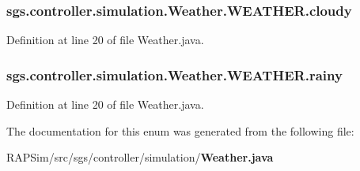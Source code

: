 \subsubsection[{cloudy}]{\setlength{\rightskip}{0pt plus 5cm}sgs.\-controller.\-simulation.\-Weather.\-W\-E\-A\-T\-H\-E\-R.\-cloudy}\label{enumsgs_1_1controller_1_1simulation_1_1_weather_1_1_w_e_a_t_h_e_r_abfd5e1962fe7a1b6d114e8fde6375cb2}


Definition at line 20 of file Weather.\-java.

\subsubsection[{rainy}]{\setlength{\rightskip}{0pt plus 5cm}sgs.\-controller.\-simulation.\-Weather.\-W\-E\-A\-T\-H\-E\-R.\-rainy}\label{enumsgs_1_1controller_1_1simulation_1_1_weather_1_1_w_e_a_t_h_e_r_ab89d21fa8e6d8d155522feefd6f0fb22}


Definition at line 20 of file Weather.\-java.



The documentation for this enum was generated from the following file\-:\begin{DoxyCompactItemize}
\item 
R\-A\-P\-Sim/src/sgs/controller/simulation/{\bf Weather.\-java}\end{DoxyCompactItemize}
